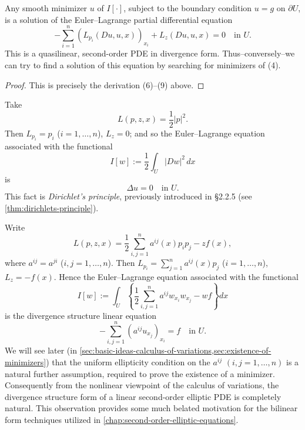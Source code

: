 \begin{theorem}
\label{thm:euler-lagrange-equation-pde-minimizer}
Any smooth minimizer $u$ of $I[\cdot]$, subject to the boundary condition $u = g$ on $\partial U$, is a solution of the Euler--Lagrange partial differential equation
\[
-\sum_{i=1}^{n}(L_{p_i}(Du, u, x))_{x_i} + L_z(Du, u, x) = 0 \quad \text{in } U.
\]
This is a quasilinear, second-order PDE in divergence form. Thus--conversely--we can try to find a solution of this equation by searching for minimizers of (4).
\end{theorem}
\begin{proof}
This is precisely the derivation (6)--(9) above.
\end{proof}

\begin{example}
\label{ex:dirichlets-principle-calculus-of-variations}
Take
\[
L(p, z, x) = \frac{1}{2}|p|^2.
\]
Then $L_{p_i} = p_i$ ($i = 1, \ldots, n$), $L_z = 0$; and so the Euler--Lagrange equation associated with the functional
\[
I[w] := \frac{1}{2}\int_U |Dw|^2 \, dx
\]
is
\[
\Delta u = 0 \quad \text{in } U.
\]
This fact is \textit{Dirichlet's principle}, previously introduced in \S2.2.5 (see \cref{thm:dirichlets-principle}).
\end{example}

\begin{example}
\label{ex:generalized-dirichlets-principle}
Write
\[
L(p, z, x) = \frac{1}{2}\sum_{i,j=1}^{n} a^{ij}(x) p_i p_j - zf(x),
\]
where $a^{ij} = a^{ji}$ ($i, j = 1, \ldots, n$). Then $L_{p_i} = \sum_{j=1}^{n} a^{ij}(x) p_j$ ($i = 1, \ldots, n$), $L_z = -f(x)$. Hence the Euler--Lagrange equation associated with the functional
\[
I[w] := \int_U \left\{\frac{1}{2}\sum_{i,j=1}^{n} a^{ij} w_{x_i} w_{x_j} - wf\right\} dx
\]
is the divergence structure linear equation
\[
-\sum_{i,j=1}^{n}(a^{ij} u_{x_j})_{x_i} = f \quad \text{in } U.
\]
We will see later (in \cref{sec:basic-ideas-calculus-of-variations,sec:existence-of-minimizers}) that the uniform ellipticity condition on the $a^{ij}$ $(i,j = 1, \ldots, n)$ is a natural further assumption, required to prove the existence of a minimizer. Consequently from the nonlinear viewpoint of the calculus of variations, the divergence structure form of a linear second-order elliptic PDE is completely natural. This observation provides some much belated motivation for the bilinear form techniques utilized in \cref{chap:second-order-elliptic-equations}.
\end{example}

